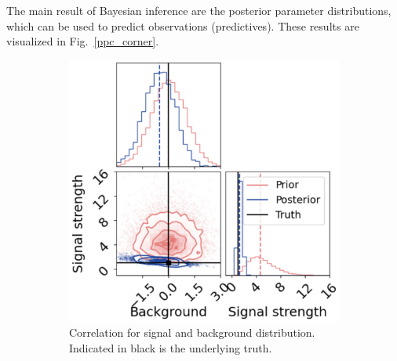 \noindent The main result of Bayesian inference are the posterior parameter distributions, which can be used to predict observations (predictives). These results are visualized in Fig.~\ref{ppc_corner}.
    \begin{figure} %
        \centering
             \begin{subfigure}[b]{0.35\textwidth}
                 \centering
                 \includegraphics[width=\textwidth]{figures/corner.png}
                 \caption{Correlation for signal and background distribution. Indicated in black is the underlying truth.}
                 \label{corner}
             \end{subfigure}
        \hspace{0.2\textwidth}
             \begin{subfigure}[b]{0.3\textwidth}
                 \centering

\end{subfigure}
\end{figure}
